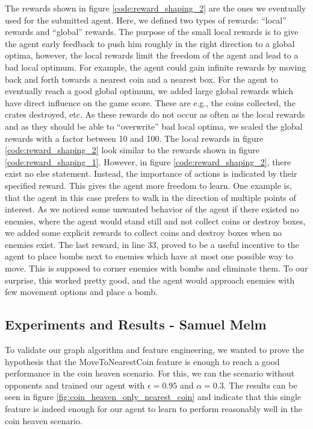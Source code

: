 \documentclass{article}
\begin{document}
The rewards shown in figure \ref{code:reward_shaping_2} are the ones we eventually used for the submitted agent. Here, we defined two types of rewards: “local” rewards and “global” rewards. The purpose of the small local rewards is to give the agent early feedback to push him roughly in the right direction to a global optima, however, the local rewards limit the freedom of the agent and lead to a bad local optimum. For example, the agent could gain infinite rewards by moving back and forth towards a nearest coin and a nearest box. For the agent to eventually reach a good global optimum, we added large global rewards which have direct influence on the game score. These are e.g., the coins collected, the crates destroyed, etc. As these rewards do not occur as often as the local rewards and as they should be able to “overwrite” bad local optima, we scaled the global rewards with a factor between 10 and 100. The local rewards in figure \ref{code:reward_shaping_2} look similar to the rewards shown in figure \ref{code:reward_shaping_1}. However, in figure \ref{code:reward_shaping_2}, there exist no else statement. Instead, the importance of actions is indicated by their specified reward. This gives the agent more freedom to learn. One example is, that the agent in this case prefers to walk in the direction of multiple points of interest. As we noticed some unwanted behavior of the agent if there existed no enemies, where the agent would stand still and not collect coins or destroy boxes, we added some explicit rewards to collect coins and destroy boxes when no enemies exist. The last reward, in line 33, proved to be a useful incentive to the agent to place bombs next to enemies which have at most one possible way to move. This is supposed to corner enemies with bombs and eliminate them. To our surprise, this worked pretty good, and the agent would approach enemies with few movement options and place a bomb.


\subsection[Experiments and Results]{Experiments and Results {\small - Samuel Melm}}
\label{section:experiemnts}

To validate our graph algorithm and feature engineering, we wanted to prove the hypothesis that the MoveToNearestCoin feature is enough to reach a good performance in the coin heaven scenario. For this, we ran the scenario without opponents and trained our agent with $\epsilon=0.95$ and $\alpha=0.3$. The results can be seen in figure \ref{fig:coin_heaven_only_nearest_coin} and indicate that this single feature is indeed enough for our agent to learn to perform reasonably well in the coin heaven scenario.
\end{document}
